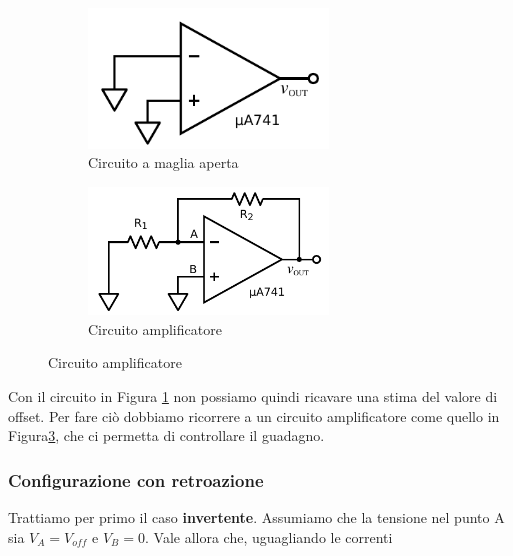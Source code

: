 \begin{figure}[ht]
        \centering
        \begin{subfigure}[b]{0.35\textwidth}
                 \includegraphics[width=0.70\textwidth]{../E02/latex/open_loop.pdf}
                \caption{Circuito a maglia aperta}
                \label{cir:open_loop}
        \end{subfigure}%
    \quad
        \begin{subfigure}[b]{0.35\textwidth}
               \includegraphics[width=0.70\textwidth]{../E02/latex/inv.pdf}
                \caption{Circuito amplificatore}
                \label{cir:inv}
        \end{subfigure}
     
\end{figure}

Con il circuito in Figura \ref{cir:open_loop} non possiamo quindi ricavare una stima del valore di offset. Per fare ciò dobbiamo ricorrere a un circuito amplificatore come quello in Figura\ref{cir:inv}, che ci permetta di controllare il guadagno.

\subsubsection{Configurazione con retroazione}

Trattiamo per primo il caso \textbf{invertente}. Assumiamo che la tensione nel punto A sia $V_A=V_{off}$ e $V_B=0$. Vale allora che, uguagliando le correnti

